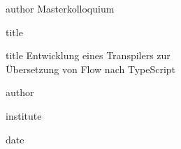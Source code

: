 \makeatletter
{}
{
  \vfill
  \begin{centering}

    \begin{beamercolorbox}[center]{author}
      \normalsize Masterkolloquium
    \end{beamercolorbox}

    \vspace{0.5cm}

    \begin{beamercolorbox}[sep=8pt,center]{title}
    \end{beamercolorbox}

    \begin{beamercolorbox}[sep=6pt,center]{title}
      \large Entwicklung eines Transpilers zur\\Übersetzung von Flow nach TypeScript
    \end{beamercolorbox}

    \vspace{0.5cm}

    \begin{beamercolorbox}[sep=3pt,center]{author}
      \normalsize\insertauthor
    \end{beamercolorbox}

    \begin{beamercolorbox}[sep=3pt,center]{institute}
    \end{beamercolorbox}

    \vspace{0.5cm}

    \begin{beamercolorbox}[sep=3pt,center]{date}
    \end{beamercolorbox}
  \end{centering}
  \vfill
}
\makeatother
